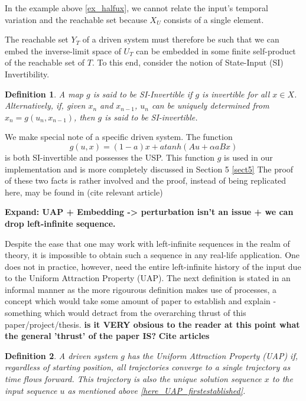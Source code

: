 \documentclass[12 pt]{article}
\newtheorem{Definition}{Definition}[]
\begin{document}
In the example above \ref{ex_halfux}, we cannot relate the input's temporal variation and the reachable set because $X_U$ consists of a single element.  

The reachable set $Y_T$ of a driven system must therefore be such that we can embed the inverse-limit space of $U_T$ can be embedded in some finite self-product of the reachable set of $T$. To this end, consider the notion of State-Input (SI) Invertibility.  

\begin{Definition}
  A map $g$ is said to be SI-Invertible if $g$ is invertible for all $x\in{X}$. Alternatively, if, given $x_n$ and $x_{n-1}$, $u_n$ can be uniquely determined from $x_n=g(u_n,x_{n-1})$, then $g$ is said to be SI-invertible.
\end{Definition}
 
We make special note of a specific driven system. The function $$g(u,x)=(1-a)x+atanh(Au+\alpha{a}Bx)$$  is both SI-invertible and possesses the USP. This function $g$ is used in our implementation and is more completely discussed in Section 5 \ref{sect5}
The proof of these two facts is rather involved and the proof, instead of being replicated here, may be found in (cite relevant article) 


\textbf{Expand: UAP + Embedding -> perturbation isn’t an issue + we can drop left-infinite sequence.  }

Despite the ease that one may work with left-infinite sequences in the realm of theory, it is impossible to obtain such a sequence in any real-life application.  One does not in practice, however, need the entire left-infinite history of the input due to the Uniform Attraction Property (UAP). The next definition is stated in an informal manner as the more rigourous definition makes use of processes, a concept which would take some amount of paper to establish and explain - something which would detract from the overarching thrust of this paper/project/thesis. \textbf{is it VERY obsious to the reader at this point what the general 'thrust' of the paper IS?} \textbf{Cite articles}

\begin{Definition}
  A driven system $g$ has the Uniform Attraction Property (UAP) if, regardless of starting position, all trajectories converge to a single trajectory as time flows forward. 
  This trajectory is also the unique solution sequence $x$ to the input sequence $u$ as mentioned above \ref{here_UAP_firstestablished}.
\end{Definition}
\end{document}
